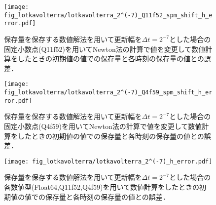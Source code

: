 \begin{figure}[H]
    \centering
    \begin{minipage}[b]{0.48\columnwidth}
        \centering
        \texttt{[image: fig\_lotkavolterra/lotkavolterra\_2^(-7)\_Q11f52\_spm\_shift\_h\_error.pdf]}
        \caption{保存量を保存する数値解法を用いて更新幅を$\Delta t =  2^{-7}$とした場合の固定小数点(Q11f52)を用いてNewton法の計算で値を変更して数値計算をしたときの初期値の値での保存量と各時刻の保存量の値との誤差．}
        \label{fig:lotkavolterra_2^(-7)_Q11f52_smp_shift_h_error}
    \end{minipage}
    \hspace{0.01\columnwidth}
    \begin{minipage}[b]{0.48\columnwidth}
        \centering
        \texttt{[image: fig\_lotkavolterra/lotkavolterra\_2^(-7)\_Q4f59\_spm\_shift\_h\_error.pdf]}   
        \caption{保存量を保存する数値解法を用いて更新幅を$\Delta t =  2^{-7}$とした場合の固定小数点(Q4f59)を用いてNewton法の計算で値を変更して数値計算をしたときの初期値の値での保存量と各時刻の保存量の値との誤差．}
        \label{fig:lotkavolterra_2^(-7)_Q3f60_smp_shift_h_error}
    \end{minipage}
\end{figure}

\begin{figure}[H]
    \centering
    \begin{minipage}[b]{0.9\columnwidth}
        \centering
        \texttt{[image: fig\_lotkavolterra/lotkavolterra\_2^(-7)\_h\_error.pdf]}
        \caption{保存量を保存する数値解法を用いて更新幅を$\Delta t =  2^{-7}$とした場合の各数値型(Float64,Q11f52,Q4f59)を用いて数値計算をしたときの初期値の値での保存量と各時刻の保存量の値との誤差．}
    \end{minipage}
\end{figure}


